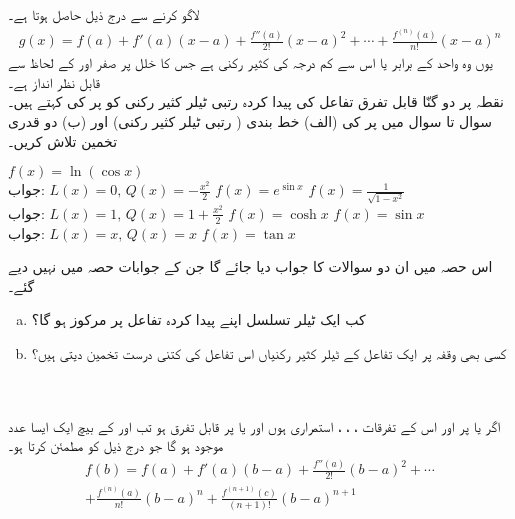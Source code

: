  لاگو کرنے سے درج ذیل حاصل ہوتا ہے۔
\begin{align*}
g(x)=f(a)+f'(a)(x-a)+\frac{f''(a)}{2!}(x-a)^2+\cdots+\frac{f^{(n)}(a)}{n!}(x-a)^n
\end{align*}
یوں  وہ واحد  کے برابر یا اس سے کم درجہ کی کثیر رکنی ہے جس کا خلل  پر صفر اور  کے لحاظ سے قابل نظر انداز ہے۔ 
\\
نقطہ  پر دو گنّا قابل تفرق تفاعل  کی پیدا کردہ  رتبی ٹیلر کثیر رکنی کو  پر  کی  کہتے ہیں۔ سوال  تا سوال  میں  پر  کی (الف) خط بندی ( رتبی ٹیلر کثیر رکنی) اور (ب) دو قدری تخمین تلاش کریں۔

$f(x)=\ln(\cos x)$\\
جواب:\quad
$L(x)=0,\, Q(x)=-\tfrac{x^2}{2}$
$f(x)=e^{\sin x}$
$f(x)=\frac{1}{\sqrt{1-x^2}}$\\
جواب:\quad
$L(x)=1,\, Q(x)=1+\tfrac{x^2}{2}$
$f(x)=\cosh x$
$f(x)=\sin x$\\
جواب:\quad
$L(x)=x,\, Q(x)=x$
$f(x)=\tan x$


اس حصہ میں ان دو سوالات کا جواب دیا جائے گا جن کے جوابات حصہ  میں نہیں دیے گئے۔
\begin{enumerate}[a.]
\item
کب ایک ٹیلر تسلسل اپنے پیدا کردہ تفاعل پر مرکوز ہو گا؟
\item
کسی بھی وقفہ پر ایک تفاعل کے ٹیلر کثیر رکنیاں اس تفاعل کی کتنی درست تخمین دیتی ہیں؟
\end{enumerate}

\\
\\
اگر  یا  پر  اور اس کے  تفرقات ، ، ،  استمراری ہوں اور  یا  پر  قابل تفرق ہو تب  اور  کے بیچ ایک ایسا عدد  موجود ہو گا جو درج ذیل کو مطمئن کرتا ہو۔
\begin{multline*}
f(b)=f(a)+f'(a)(b-a)+\frac{f''(a)}{2!}(b-a)^2+\cdots\\
+\frac{f^{(n)}(a)}{n!}(b-a)^n+\frac{f^{(n+1)}(c)}{(n+1)!}(b-a)^{n+1}
\end{multline*}

